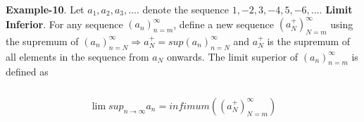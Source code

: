 \documentclass[a4paper]{article}
\begin{document}
\textbf{Example-10}.
Let $a_1,a_2,a_3,....$ denote the sequence $ 1,-2,3,-4,5,-6,....$
\textbf{Limit Inferior}.
For any sequence $(a_n)^\infty_{n=m}$, define a new sequence $(a_N^+)^\infty_{N=m}$ using the supremum of  $(a_n)^\infty_{n=N} \Rightarrow a_N^+ = sup (a_n)^\infty_{n=N}$ and $a_N^+$ is the supremum of all elements in the sequence from $a_N$ onwards. The limit superior of $(a_n)^\infty_{n=m}$ is defined as 
	\\
	\\
	\begin{align}
	\begin{split}
	\lim sup_{n \to \infty} a_n = infimum((a_N^+)^\infty_{N=m})
	\end{split}
	\end{align}
	



\end{document}
